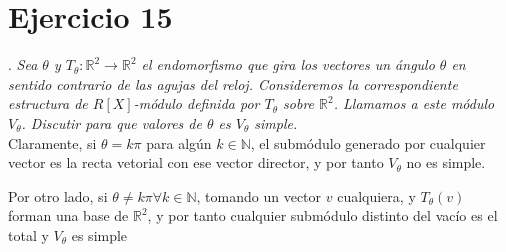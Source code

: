 \section{Ejercicio 15}.
\textit{Sea \(\theta\) y \(T_\theta: \mathbb{R}^2 \rightarrow \mathbb{R}^2\) el endomorfismo que gira los vectores un ángulo \(\theta\) en sentido contrario de las agujas del reloj. Consideremos la correspondiente estructura de \(R[X]\)-módulo definida por \(T_\theta\) sobre \(\mathbb{R}^2\). Llamamos a este módulo \(V_\theta\). Discutir para que valores de \(\theta\) es \(V_\theta\) simple.}\\

Claramente, si \(\theta = k\pi\) para algún \(k \in \mathbb{N}\),  el submódulo generado por cualquier vector es la recta vetorial con ese vector director, y por tanto \(V_\theta\) no es simple.

Por otro lado, si \(\theta \neq k\pi \forall k \in \mathbb{N}\), tomando un vector \(v\) cualquiera, y \(T_\theta(v)\) forman una base de \(\mathbb{R}^2\), y por tanto cualquier submódulo distinto del vacío es el total y \(V_\theta \) es simple
